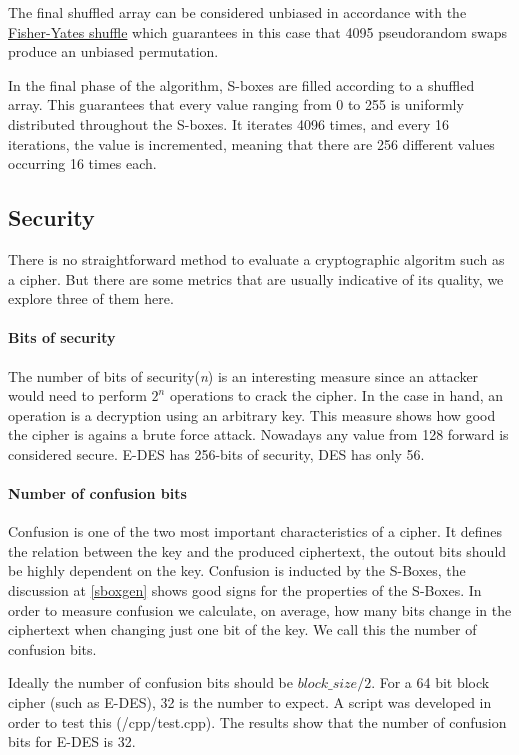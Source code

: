 \documentclass{article} %
\begin{document}
The final shuffled array can be considered unbiased in accordance with the \href{https://en.wikipedia.org/wiki/Fisher%E2%80%93Yates_shuffle}{Fisher-Yates shuffle} which guarantees in this case that 4095 pseudorandom swaps produce an unbiased permutation. 

In the final phase of the algorithm, S-boxes are filled according to a shuffled array. This guarantees that every value ranging from 0 to 255 is uniformly distributed throughout the S-boxes. It iterates 4096 times, and every 16 iterations, the value is incremented, meaning that there are 256 different values occurring 16 times each.


\subsection{Security}
There is no straightforward method to evaluate a cryptographic algoritm such as a cipher. But there are some metrics that are usually indicative of its quality, 
we explore three of them here.

\paragraph{Bits of security}
The number of bits of security(\textit{n}) is an interesting measure since an attacker would need to perform $2^{n}$ operations to crack the cipher. In the case in hand, an operation
is a decryption using an arbitrary key. This measure shows how good the cipher is agains a brute force attack.
Nowadays any value from 128 forward is considered secure. E-DES has 256-bits of security, DES has only 56.

\paragraph{Number of confusion bits}
Confusion is one of the two most important characteristics of a cipher. It defines the relation between the key and the produced ciphertext, the outout bits should be 
highly dependent on the key. Confusion is inducted by the S-Boxes, the discussion at \autoref{sboxgen} shows good signs for the properties of the S-Boxes. 
In order to measure confusion we calculate, on average, how many bits change in the 
ciphertext when changing just one bit of the key. We call this the number of confusion bits.

Ideally the number of confusion bits should be $block\_size/2$. For a 64 bit block cipher (such as E-DES), 32 is the number to expect. A script was developed in order
to test this (/cpp/test.cpp). The results show that the number of confusion bits for E-DES is 32.
\end{document}
